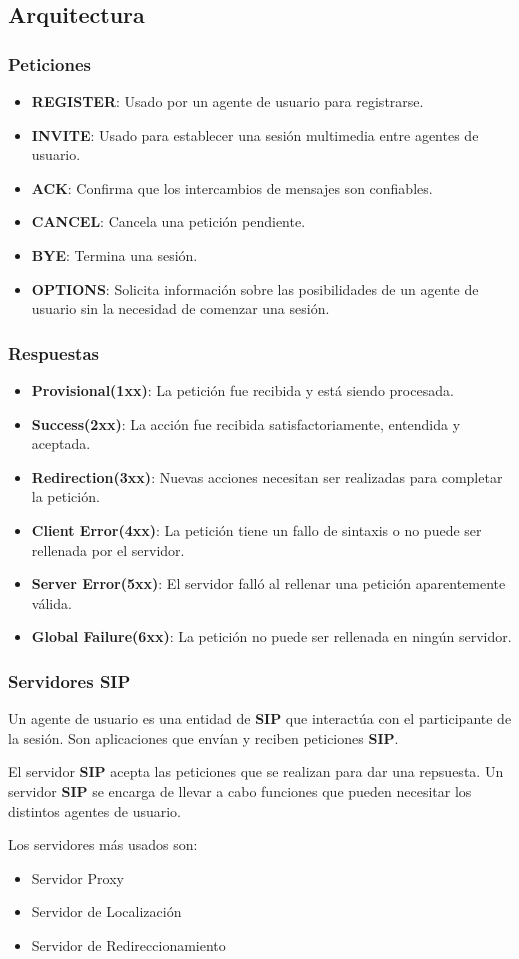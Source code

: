 \documentclass{beamer}
\begin{document}
	\subsection{Arquitectura}
	\begin{frame}
	\frametitle{Peticiones}
		\begin{itemize}
			\item \textbf{REGISTER}: Usado por un agente de usuario para registrarse.
			\item \textbf{INVITE}: Usado para establecer una sesión multimedia entre agentes de usuario.
			\item \textbf{ACK}: Confirma que los intercambios de mensajes son confiables.
			\item \textbf{CANCEL}: Cancela una petición pendiente.
			\item \textbf{BYE}: Termina una sesión.
			\item \textbf{OPTIONS}: Solicita información sobre las posibilidades de un agente de usuario sin la necesidad de comenzar una sesión.
		\end{itemize}
	\end{frame}
	
	\begin{frame}
	\frametitle{Respuestas}
		\begin{itemize}
			\item \textbf{Provisional(1xx)}: La petición fue recibida y está siendo  procesada.
			\item \textbf{Success(2xx)}: La acción fue recibida satisfactoriamente, entendida y aceptada.
			\item \textbf{Redirection(3xx)}: Nuevas acciones necesitan ser realizadas para completar la petición.
			\item \textbf{Client Error(4xx)}: La petición tiene un fallo de sintaxis o no puede ser rellenada por el servidor.
			\item \textbf{Server Error(5xx)}: El servidor falló al rellenar una petición aparentemente válida.
			\item \textbf{Global Failure(6xx)}: La petición no puede ser rellenada en ningún servidor.
		\end{itemize}
	\end{frame}
	
	\begin{frame}
	\frametitle{Servidores SIP}
		Un agente de usuario es una entidad de \textbf{SIP} que interactúa con el participante de la sesión. Son aplicaciones que envían y reciben peticiones \textbf{SIP}.
		
		El servidor \textbf{SIP} acepta las peticiones que se realizan para dar una repsuesta. Un servidor \textbf{SIP} se encarga de llevar a cabo funciones que pueden necesitar los distintos agentes de usuario.
		
		Los servidores más usados son:
		\begin{itemize}
			\item Servidor Proxy
			\item Servidor de Localización
			\item Servidor de Redireccionamiento
		\end{itemize}
	\end{frame}
	
\end{document}
